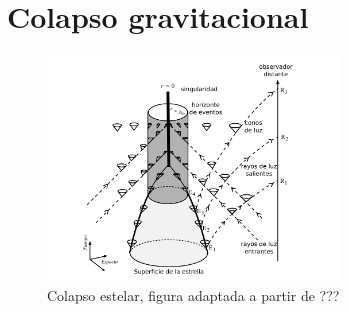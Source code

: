 \section{Colapso gravitacional}

%

\begin{figure}[H]
\begin{center}
\includegraphics[height=6cm]{fig/fig-colapso.pdf}
\caption{Colapso estelar, figura adaptada a partir de ???}
\label{fig:colapso}
\end{center}
\end{figure}